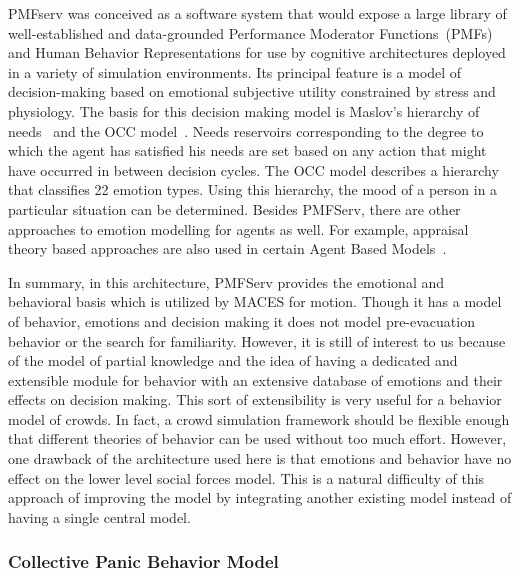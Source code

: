 PMFserv was conceived as a software system that would expose a large library of well-established and data-grounded Performance Moderator Functions~(PMFs) and Human Behavior Representations for use by cognitive architectures deployed in a variety of simulation environments. Its principal feature is a model of decision-making based on emotional subjective utility constrained by stress and physiology. The basis for this decision making model is Maslov's hierarchy of needs~\cite{Maslow:1943vr} and the OCC model~\cite{Orton:1990tx}. Needs reservoirs corresponding to the degree to which the agent has satisfied his needs are set based on any action that might have occurred in between decision cycles. The OCC model describes a hierarchy that classifies 22 emotion types. Using this hierarchy, the mood of a person in a particular situation can be determined. Besides PMFServ, there are other approaches to emotion modelling for agents as well. For example, appraisal theory based approaches are also used in certain Agent Based Models~\cite{Aydt:2011wz}.

In summary, in this architecture, PMFServ provides the emotional and behavioral basis which is utilized by MACES for motion. Though it has a model of behavior, emotions and decision making it does not model pre-evacuation behavior or the search for familiarity. However, it is still of interest to us because of the model of partial knowledge and the idea of having a dedicated and extensible module for behavior with an extensive database of emotions and their effects on decision making. This sort of extensibility is very useful for a behavior model of crowds. In fact, a crowd simulation framework should be flexible enough that different theories of behavior can be used without too much effort. However, one drawback of the architecture used here is that emotions and behavior have no effect on the lower level social forces model. This is a natural difficulty of this approach of improving the model by integrating another existing model instead of having a single central model.

\subsubsection{Collective Panic Behavior Model}

